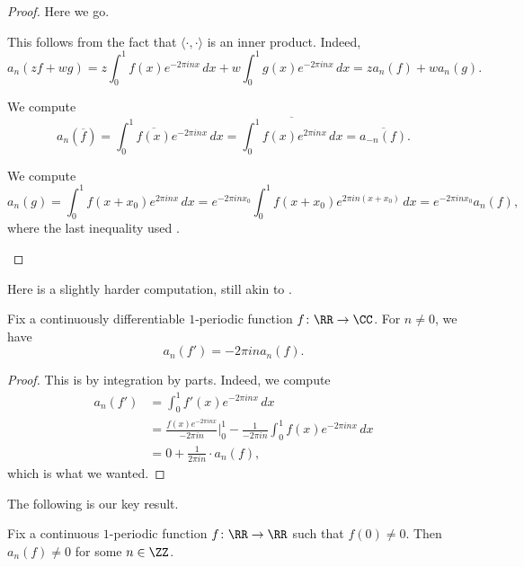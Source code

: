 \documentclass[notes.tex]{subfiles}
\begin{document}
\begin{proof}
	Here we go.
	\begin{listalph}
		\item This follows from the fact that $\langle\cdot,\cdot\rangle$ is an inner product. Indeed,
		\[a_n(zf+wg)=z\int_0^1f(x)e^{-2\pi inx}\,dx+w\int_0^1g(x)e^{-2\pi inx}\,dx=za_n(f)+wa_n(g).\]
		\item We compute
		\[a_n(\overline f)=\int_0^1\overline{f(x)}e^{-2\pi inx}\,dx=\overline{\int_0^1f(x)e^{2\pi inx}\,dx}=\overline{a_{-n}(f)}.\]
		\item We compute
		\[a_n(g)=\int_0^1f(x+x_0)e^{2\pi inx}\,dx=e^{-2\pi inx_0}\int_0^1f(x+x_0)e^{2\pi in(x+x_0)}\,dx=e^{-2\pi inx_0}a_n(f),\]
		where the last inequality used .
		\qedhere
	\end{listalph}
\end{proof}
Here is a slightly harder computation, still akin to .
\begin{lemma} \label{lem:defiv-fourier-coefs}
	Fix a continuously differentiable $1$-periodic function $f\colon\RR\to\CC$. For $n\ne0$, we have
	\[a_n(f')=-2\pi ina_n(f).\]
\end{lemma}
\begin{proof}
	This is by integration by parts. Indeed, we compute
	\begin{align*}
		a_n(f') &= \int_0^1f'(x)e^{-2\pi inx}\,dx \\
		&= \frac{f(x)e^{-2\pi inx}}{-2\pi in}\bigg|_0^1-\frac1{-2\pi in}\int_0^1f(x)e^{-2\pi inx}\,dx \\
		&= 0+\frac1{2\pi in}\cdot a_n(f),
	\end{align*}
	which is what we wanted.
\end{proof}
The following is our key result.
\begin{lemma} \label{lem:get-zero-from-coefs}
	Fix a continuous $1$-periodic function $f\colon\RR\to\RR$ such that $f(0)\ne0$. Then $a_n(f)\ne0$ for some $n\in\ZZ$.
\end{lemma}
\end{document}
